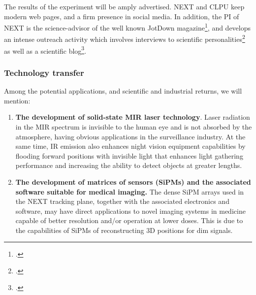 The results of the experiment will be amply advertised. NEXT and CLPU keep modern web pages, and a firm presence in social media. In addition, the PI of NEXT is the science-advisor of the well known JotDown magazine\footcite{JotDown}, and develops an intense outreach activity which involves interviews to scientific personalities\footcite{JotDownNygrenBettini, JotDownCattaiGonzalez, JotDownHalzen} as well as a scientific blog\footcite{JotDownBlog}.

\subsubsection{Technology transfer}

Among the potential applications, and scientific and industrial returns, we will mention:
\begin{enumerate}
\item {\bf The development of solid-state MIR laser technology}. Laser radiation in the MIR spectrum is invisible to the human eye and is not absorbed by the atmosphere, having obvious applications in the surveillance industry. At the same time, IR emission also enhances night vision equipment capabilities by flooding forward positions with invisible light that enhances light gathering performance and increasing the ability to detect objects at greater lengths. 
\item {\bf The development of matrices of sensors (SiPMs) and the associated software suitable for medical imaging.} The dense SiPM arrays used in the NEXT tracking plane, together with the associated electronics and software, may have direct applications to novel imaging systems in medicine capable of better resolution and/or operation at lower doses. This is due to the capabilities of SiPMs of reconstructing 3D positions for dim signals. 
\end{enumerate}
